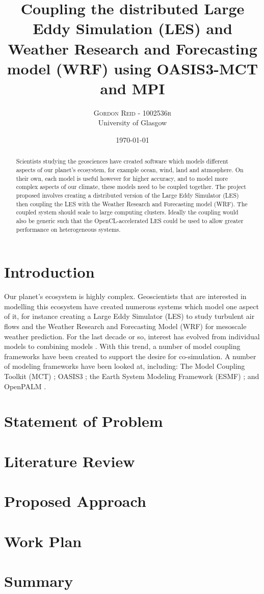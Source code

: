 \documentclass[a4page,twocolumn]{article}
\title{Coupling the distributed Large Eddy Simulation (LES) and Weather
Research and Forecasting model (WRF) using OASIS3-MCT and MPI}
\author{\large\textsc{Gordon Reid - 1002536r}\\University of Glasgow}
\date{\today}
\begin{document}
\setlength{\parskip}{0.3cm}

\maketitle

\begin{abstract}

\noindent Scientists studying the geosciences have created software which models
different aspects of our planet's ecosystem, for example ocean, wind, land and
atmosphere. On their own, each model is useful however for higher accuracy, and
to model more complex aspects of our climate, these models need to be coupled
together. The project proposed involves creating a distributed version of the
Large Eddy Simulator (LES) then coupling the LES with the Weather Research and
Forecasting model (WRF). The coupled system should scale to large computing
clusters. Ideally the coupling would also be generic such that the
OpenCL-accelerated LES could be used to allow greater performance on
heterogeneous systems.

\end{abstract}

\section*{Introduction}

Our planet's ecosystem is highly complex. Geoscientists that are interested in
modelling this ecosystem have created numerous systems which model one aspect of
it, for instance creating a Large Eddy Simulator (LES) to study turbulent air
flows \cite{Nakayama2011,Nakayama2012} and the Weather Research and Forecasting
Model (WRF) for mesoscale weather prediction. For the last decade or so,
interest has evolved from individual models to combining models
\cite{Michalakes2010}. With this trend, a number of model coupling frameworks
have been created to support the desire for co-simulation. A number of modeling
frameworks have been looked at, including: The Model Coupling Toolkit (MCT)
\cite{Larson2005}; OASIS3 \cite{Valcke,Valcke2013}; the Earth System Modeling
Framework (ESMF) \cite{Ramework2004}; and OpenPALM \cite{Piacentini2011}.

\section*{Statement of Problem}

\section*{Literature Review}

\section*{Proposed Approach}

\section*{Work Plan}

\section*{Summary}



\end{document}
